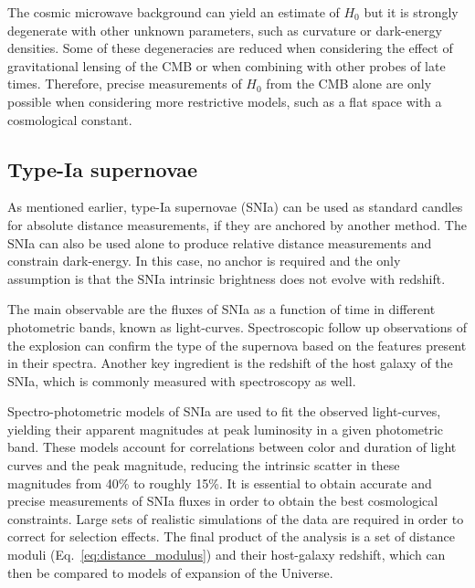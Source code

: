    The cosmic microwave background can yield an estimate of 
    $H_0$ but it is strongly degenerate with other unknown parameters, such as curvature
    or dark-energy densities. Some of these degeneracies are reduced when considering 
    the effect of gravitational lensing of the CMB or when combining with other probes
    of late times. Therefore, precise measurements of $H_0$ from the CMB alone are only 
    possible when considering more restrictive models, such as a flat 
    space with a cosmological constant. 

    \subsection{Type-Ia supernovae}
    \label{intro:probes:snia}

    As mentioned earlier, type-Ia supernovae (SNIa) can be used as standard candles for 
    absolute distance measurements, if they are anchored by another method. 
    The SNIa can also be used alone to produce relative distance measurements and 
    constrain dark-energy. In this case, no anchor is required and the only assumption is
    that the SNIa intrinsic brightness does not evolve with redshift. 
     
    The main observable are the fluxes of SNIa as a function of time in different 
    photometric bands, known as light-curves. Spectroscopic follow up observations of 
    the explosion can confirm the type of the supernova based on the features
    present in their spectra. Another key ingredient is the redshift of the host 
    galaxy of the SNIa, which is commonly measured with spectroscopy as well.
    
    Spectro-photometric models of SNIa are used to fit the observed 
    light-curves, yielding their apparent magnitudes 
    at peak luminosity in a given photometric band. 
    These models account for correlations between color and duration of light curves 
    and the peak magnitude, reducing the intrinsic scatter in these magnitudes from 
    40\% to roughly 15\%. 
    It is essential to obtain accurate and precise measurements 
    of SNIa fluxes in order to obtain the best cosmological constraints. 
    Large sets of realistic simulations of the data are required in order to 
    correct for selection effects. The final product of the analysis is a set
    of distance moduli (Eq.~\ref{eq:distance_modulus}) and their host-galaxy redshift, 
    which can then be compared to models of expansion of the Universe. 
    
